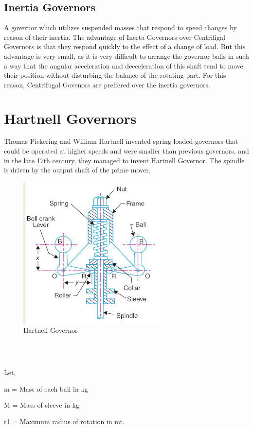 \documentclass[15pt,a4paper,oneside]{article}
\begin{document}
	\subsection{Inertia Governors}
	A governor which utilizes suspended masses that respond to speed changes by reason of their inertia. The advantage of Inerta Governors over Centrifigal Governors is that they respond quickly to the effect of a change of load. But this advantage is very small, as it is very difficult to arrange the governor balls in such a way that the angular acceleration and decceleration of this shaft tend to move their position without disturbing the balance of the rotating part. For this reason, Centrifugal Govenors are preffered over the inertia governors.
	\section{Hartnell Governors}
	Thomas Pickering and William Hartnell invented spring loaded governors that could be operated at higher speeds and were smaller than previous governors, and in the late 17th century, they managed to invent Hartnell Governor. The spindle is driven by the output shaft of the prime mover.\\[1cm] 
	\begin{figure}[h]
	\centerline{\includegraphics[scale=0.62]{pasted2.png}}
	\caption{Hartnell Governor}
	\label{fig}
	
	\end{figure}\\[1cm]
$$

Let,


m = Mass of each ball in kg

M = Mass of sleeve in kg

r1 = Maximum radius of rotation in mt.
\end{document}
